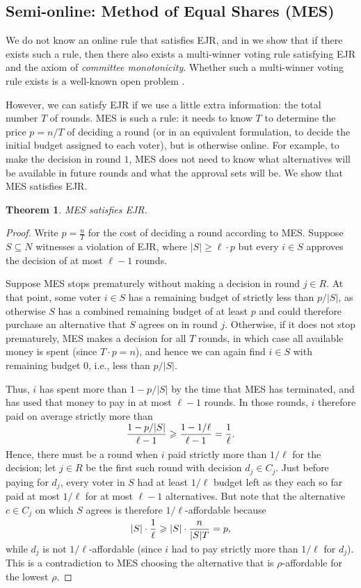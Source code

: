 \documentclass[10pt]{scrartcl}
\theoremstyle{plain}
\newtheorem{theorem}{Theorem}[section]
\theoremstyle{definition}
\renewcommand*{\ge}{\geqslant}
\renewcommand*{\geq}{\geqslant}
\begin{document}
\subsection{Semi-online: Method of Equal Shares (MES)}
\label{sec:guarantees:mes}

We do not know an online rule that satisfies EJR, and in  we show that if there exists such a rule, then there also exists a multi-winner voting rule satisfying EJR and the axiom of \emph{committee monotonicity}. Whether such a multi-winner voting rule exists is a well-known open problem \citep{lacknerskowron}.

However, we can satisfy EJR if we use a little extra information: the total number $T$ of rounds. MES is such a rule: it needs to know $T$ to determine the price $p = n/T$ of deciding a round (or in an equivalent formulation, to decide the initial budget assigned to each voter), but is otherwise online. For example, to make the decision in round $1$, MES does not need to know what alternatives will be available in future rounds and what the approval sets will be. We show that MES satisfies EJR. 

\begin{theorem}
    MES satisfies EJR.
\end{theorem}

\begin{proof}
Write $p = \frac{n}{T}$ for the cost of deciding a round according to MES. Suppose $S \subseteq N$ witnesses a violation of EJR, where $|S| \ge \ell \cdot p$ but every $i \in S$ approves the decision of at most $\ell - 1$ rounds.

Suppose MES stops prematurely without making a decision in round $j \in R$. At that point, some voter $i \in S$ has a remaining budget of strictly less than $p/|S|$, as otherwise $S$ has a combined remaining budget of at least $p$ and could therefore purchase an alternative that $S$ agrees on in round $j$. Otherwise, if it does not stop prematurely, MES makes a decision for all $T$ rounds, in which case all available money is spent (since $T \cdot p = n$), and hence we can again find $i \in S$ with remaining budget 0, i.e., less than $p/|S|$.

Thus, $i$ has spent more than $1 - p/|S|$ by the time that MES has terminated, and has used that money to pay in at most $\ell-1$ rounds. In those rounds, $i$ therefore paid on average strictly more than 
\[
\smash{\frac{1 - p/|S|}{\ell-1} \geq \frac{1 - 1/\ell}{\ell-1}=\frac{1}{\ell}}.
\] 
Hence, there must be a round when $i$ paid strictly more than $1/\ell$ for the decision; let $j \in R$ be the first such round with decision $d_j \in C_j$. Just before paying for $d_j$, every voter in $S$ had at least $1/\ell$ budget left as they each so far paid at most $1/\ell$ for at most $\ell-1$ alternatives. 
But note that the alternative $c \in C_j$ on which $S$ agrees is therefore $1/\ell$-affordable because 
\[
\smash{|S| \cdot \frac{1}{\ell} \geq |S|\cdot \frac{n}{|S|T} = p},
\]
while $d_j$ is not $1/\ell$-affordable (since $i$ had to pay strictly more than $1/\ell$ for $d_j$). This is a contradiction to MES choosing the alternative that is $\rho$-affordable for the lowest $\rho$.
\end{proof}
\end{document}
